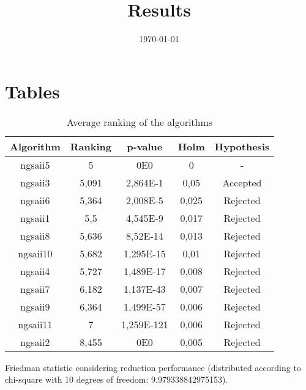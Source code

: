 \documentclass{article}
\title{Results}
\author{}
\date{\today}
\begin{document}
\oddsidemargin 0in \topmargin 0in\maketitle

\section{Tables}
\begin{table}[!htp]
\centering
\begin{tabular}{c|c|c|c|c}
Algorithm&Ranking&p-value&Holm&Hypothesis\\
\hline
ngsaii5 & 5 & 0E0 & 0 & -\\
ngsaii3 & 5,091 & 2,864E-1 & 0,05 & Accepted\\
ngsaii6 & 5,364 & 2,008E-5 & 0,025 & Rejected\\
ngsaii1 & 5,5 & 4,545E-9 & 0,017 & Rejected\\
ngsaii8 & 5,636 & 8,52E-14 & 0,013 & Rejected\\
ngsaii10 & 5,682 & 1,295E-15 & 0,01 & Rejected\\
ngsaii4 & 5,727 & 1,489E-17 & 0,008 & Rejected\\
ngsaii7 & 6,182 & 1,137E-43 & 0,007 & Rejected\\
ngsaii9 & 6,364 & 1,499E-57 & 0,006 & Rejected\\
ngsaii11 & 7 & 1,259E-121 & 0,006 & Rejected\\
ngsaii2 & 8,455 & 0E0 & 0,005 & Rejected\\
\end{tabular}
\caption{Average ranking of the algorithms}
\end{table}


Friedman statistic considering reduction performance (distributed according to chi-square with 10 degrees of freedom: 9.979338842975153).
\end{document}
